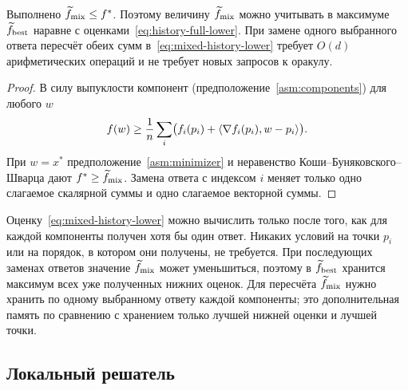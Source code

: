 \begin{proposition}\label{prop:mixed-history}
Выполнено $\widetilde f_{\rm mix}\le f^\ast$. Поэтому величину
$\widetilde f_{\rm mix}$ можно учитывать в максимуме $\widetilde f_{\rm best}$
наравне с оценками~\eqref{eq:history-full-lower}. При замене одного
выбранного ответа пересчёт обеих сумм в~\eqref{eq:mixed-history-lower}
требует $O(d)$ арифметических операций и не требует новых запросов к оракулу.
\end{proposition}

\begin{proof}
В силу выпуклости компонент (предположение~\ref{asm:components})
для любого $w$
\[
 f(w)\ge\frac1n\sum_i\bigl(f_i(p_i)+\langle \nabla f_i(p_i),w-p_i\rangle\bigr).
\]
При $w=x^\ast$ предположение~\ref{asm:minimizer}
и неравенство Коши--Буняковского--Шварца дают
$f^\ast\ge\widetilde f_{\rm mix}$. Замена ответа с индексом $i$
меняет только одно слагаемое скалярной суммы и одно слагаемое
векторной суммы.
\end{proof}

Оценку~\eqref{eq:mixed-history-lower} можно вычислить только после того,
как для каждой компоненты получен хотя бы один ответ. Никаких условий
на точки $p_i$ или на порядок, в котором они получены, не требуется.
При последующих заменах ответов значение $\widetilde f_{\rm mix}$ может
уменьшиться, поэтому в $\widetilde f_{\rm best}$ хранится максимум всех
уже полученных нижних оценок. Для пересчёта $\widetilde f_{\rm mix}$
нужно хранить по одному выбранному ответу каждой компоненты; это
дополнительная память по сравнению с хранением только лучшей нижней
оценки и лучшей точки.

\subsection{Локальный решатель}\label{app:local-proofs}

